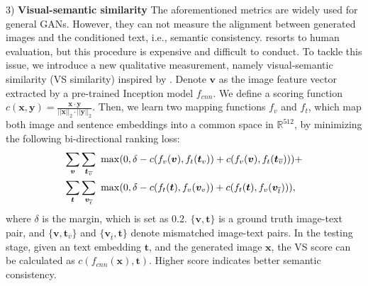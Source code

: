 \documentclass[10pt,twocolumn,letterpaper]{article}
\begin{document}
3) \textbf{Visual-semantic similarity} The aforementioned metrics are widely used for general GANs. However, they can not measure the alignment between generated images and the conditioned text, i.e., semantic consistency. \cite{han2017stackgan} resorts to human evaluation, but this procedure is expensive and difficult to conduct.
To tackle this issue, we introduce a new qualitative measurement, namely visual-semantic similarity (VS similarity) inspired by \cite{vsemb}.
Denote $\bm{v}$ as the image feature vector extracted by a pre-trained Inception model $f_{cnn}$.
We define a scoring function $c(\bm{x}, \bm{y})=\frac{\bm{x}\cdot \bm{y}}{||\bm{x}||_2\cdot ||\bm{y}||_2}$. 
Then, we learn two mapping functions $f_v$ and $f_t$, which map both image and sentence embeddings into a common space in $\mathbb{R}^{512}$, by minimizing the following bi-directional ranking loss:
\begin{equation}\vspace{-.2cm}
\begin{split}
  \sum_{ \bm{v} }\sum_{ \bm{t}_{\overline{v}} }~ &\max( 0, \delta  - c(f_v(\bm{v}), f_t( \bm{t}_{{v}}) )+ c(f_v(\bm{v}), f_t( \bm{t}_{\overline{v}}) )     ) +\\
   \sum_{ \bm{t} }\sum_{ \bm{v}_{\overline{t}} }~ &\max( 0,  \delta  - c(f_t(\bm{t}), f_v( \bm{v}_{{v}} )) +  c(f_t(\bm{t}), f_v( \bm{v}_{\overline{t}} ))  ),
\end{split}
\vspace{-.2cm}
\end{equation}
where $\delta$ is the margin, which is set as 0.2. $\{\bm{v}, \bm{t}\}$ is a ground truth image-text pair, and $\{\bm v, \bm t_{\overline{v}} \}$ and $\{ \bm v_{\overline{t}}, \bm{t} \}$ denote mismatched image-text pairs. In the testing stage, given an text embedding $\bm{t}$, and the generated image $\bm{x}$, the VS score can be calculated as $c(f_{cnn}(\bm{x}), \bm{t})$. Higher score indicates better semantic consistency.
\end{document}
